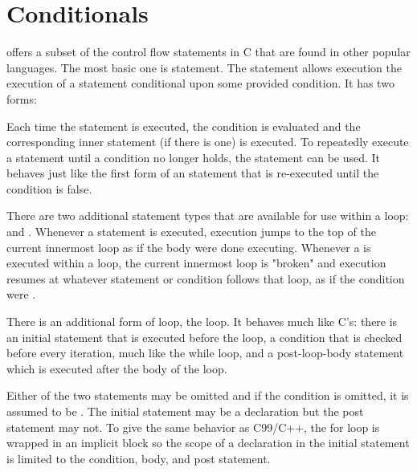\section{Conditionals}

\langname{} offers a subset of the control flow statements in C that are found in
other popular languages. The most basic one is  statement. The
 statement allows execution the execution of a statement
conditional upon some provided condition. It has two forms:

\grammarbegin
\grmselectionstatement
\grammarend

Each time the  statement is executed, the condition is evaluated
and the corresponding inner statement (if there is one) is executed. To
repeatedly execute a statement until a condition no longer holds, the
 statement can be used. It behaves just like the first form of
an  statement that is re-executed until the condition is false.

\grammarbegin
{}
\grmwhilestatement
\grammarend


There are two additional statement types that are available for use within a
loop:  and . Whenever a 
statement is executed, execution jumps to the top of the current innermost loop
as if the body were done executing. Whenever a  is executed
within a loop, the current innermost loop is "broken" and execution resumes at
whatever statement or condition follows that loop, as if the condition were
.

\grammarbegin
{}
\grmbreakstatement
\grmcontinuestatement
\grammarend

There is an additional form of loop, the  loop. It behaves much
like C's: there is an initial statement that is executed before the loop, a
condition that is checked before every iteration, much like the while loop, and
a post-loop-body statement which is executed after the body of the loop.

\grammarbegin
\grminitializerstatement{}

\grmforstatement
\grammarend

Either of the two statements may be omitted and if the condition is omitted, it
is assumed to be . The initial statement may be a declaration
but the post statement may not. To give the same behavior as C99/C++, the for
loop is wrapped in an implicit block so the scope of a declaration in the
initial statement is limited to the condition, body, and post statement.

